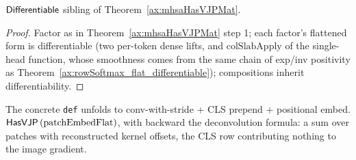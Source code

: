 \begin{theorem}
  \label{ax:mhsaLayer_flat_differentiable}
  \leanok
  \(\mathsf{Differentiable}\) sibling of Theorem~\ref{ax:mhsaHasVJPMat}.
\end{theorem}

\begin{proof}
\leanok
Factor as in Theorem~\ref{ax:mhsaHasVJPMat} step 1; each factor's
flattened form is differentiable (two per-token dense lifts, and
\(\mathrm{colSlabApply}\) of the single-head function, whose
smoothness comes from the same chain of exp/inv positivity as
Theorem~\ref{ax:rowSoftmax_flat_differentiable}); compositions inherit
differentiability. \Qed{}
\end{proof}

\begin{theorem}
  \label{ax:patchEmbedFlatHasVJP}
  \leanok
  The concrete \texttt{def} unfolds to conv-with-stride + CLS prepend +
  positional embed.
  \Prove{} \(\mathsf{HasVJP}\, (\mathrm{patchEmbedFlat})\), with backward
  the deconvolution formula: a sum over patches with reconstructed
  kernel offsets, the CLS row contributing nothing to the image
  gradient.
\end{theorem}

